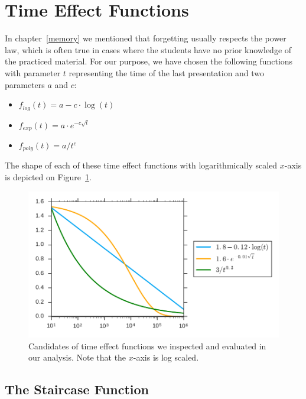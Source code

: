 \section{Time Effect Functions}
\label{time-effect-functions}

In chapter~\ref{memory} we mentioned that forgetting usually respects the power law, which is often true in cases where the students have no prior knowledge of the practiced material. For our purpose, we have chosen the following functions with parameter $t$ representing the time of the last presentation and two parameters $a$ and $c$:

\begin{itemize}
  \item $f_{\mathit{log}}(t) = a - c \cdot \log(t)$
  \item $f_{\mathit{exp}}(t) = a \cdot e^{-c \sqrt{t}}$
  \item $f_{\mathit{poly}}(t) = a / t^c$
\end{itemize}

The shape of each of these time effect functions with logarithmically scaled $x$-axis is depicted on Figure~\ref{fig-time-effect-functions}.

\begin{figure}[htbp]
  \centering
  \includegraphics[width=\textwidth]{img/time-effect-functions}
  \caption{Candidates of time effect functions we inspected and evaluated in our analysis. Note that the $x$-axis is log scaled.}
  \label{fig-time-effect-functions}
\end{figure}

\subsection{The Staircase Function}
\label{staircase-function}

